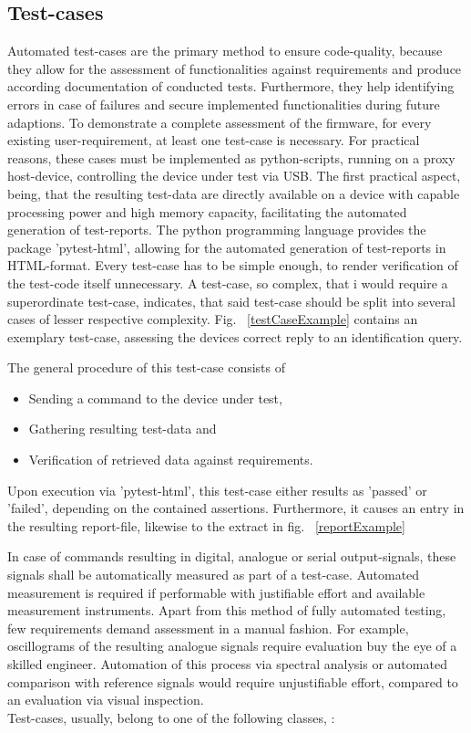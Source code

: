 \documentclass[master,english,smartquotes,apa]{hgbthesis}
\begin{document}
			\subsection{Test-cases}
			Automated test-cases are the primary method to ensure code-quality, because they allow for the assessment of functionalities against requirements and produce according documentation of conducted tests. Furthermore, they help identifying  errors in case of failures and secure implemented functionalities during future adaptions. To demonstrate a complete assessment of the firmware, for every existing user-requirement, at least one test-case is necessary. For practical reasons, these cases must be implemented as python-scripts, running on a proxy host-device, controlling the device under test via USB. The first practical aspect, being, that the resulting test-data are directly available on a device with capable processing power and high memory capacity, facilitating the automated generation of test-reports. The python programming language provides the package 'pytest-html', allowing for the automated generation of test-reports in HTML-format. Every test-case has to be simple enough, to render verification of the test-code itself unnecessary. A test-case, so complex, that i would require a superordinate test-case, indicates, that said test-case should be split into several cases of lesser respective complexity. Fig. ~\ref{testCaseExample} contains an exemplary test-case, assessing the devices correct reply to an identification query. \cite{BalajiScpi}
			
			The general procedure of this test-case consists of 
			\begin{itemize} \setlength\itemsep{1px}
			\item Sending a command to the device under test,
			\item Gathering resulting test-data and
			\item Verification of retrieved data against requirements.
			\end{itemize}
			Upon execution via 'pytest-html', this test-case either results as 'passed' or 'failed', depending on the contained assertions. Furthermore, it causes an entry in the resulting report-file, likewise to the extract in fig. ~\ref{reportExample}
			
			
			In case of commands resulting in digital, analogue or serial output-signals, these signals shall be automatically measured as part of a test-case. Automated measurement is required if performable with justifiable effort and available measurement instruments. Apart from this method of fully automated testing, few requirements demand assessment in a manual fashion. For example, oscillograms of the resulting analogue signals require evaluation buy the eye of a skilled engineer. Automation of this process via spectral analysis or automated comparison with reference signals would require unjustifiable effort, compared to an evaluation via visual inspection. \\
			Test-cases, usually, belong to one of the following classes, :
\end{document}
